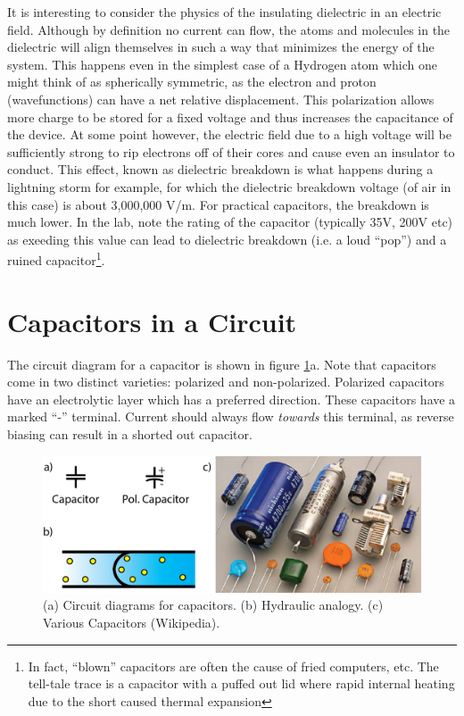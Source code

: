 \documentclass{tufte-book}
\begin{document}
It is interesting to consider the physics of the insulating dielectric in an electric field. Although by definition no current can flow, the atoms and molecules in the dielectric will align themselves in such a way that minimizes the energy of the system. This happens even in the simplest case of a Hydrogen atom which one might think of as spherically symmetric, as the electron and proton (wavefunctions) can have a net relative displacement. This polarization allows more charge to be stored for a fixed voltage and thus increases the capacitance of the device. At some point however, the electric field due to a high voltage will be sufficiently strong to rip electrons off of their cores and cause even an insulator to conduct. This effect, known as dielectric breakdown is what happens during a lightning storm for example, for which the dielectric breakdown voltage (of air in this case) is about 3,000,000 V/m. For practical capacitors, the breakdown is much lower. In the lab, note the rating of the capacitor (typically 35V, 200V etc) as exeeding this value can lead to dielectric breakdown (i.e. a loud ``pop'') and a ruined capacitor\footnote{In fact, ``blown'' capacitors are often the cause of fried computers, etc. The tell-tale trace is a capacitor with a puffed out lid where rapid internal heating due to the short caused thermal expansion}.

\section{Capacitors in a Circuit}

The circuit diagram for a capacitor is shown in figure \ref{fig:capz}a. Note that capacitors come in two distinct varieties: polarized and non-polarized. Polarized capacitors have an electrolytic layer which has a preferred direction. These capacitors have a marked ``-'' terminal. Current should always flow \textit{towards} this terminal, as reverse biasing can result in a shorted out capacitor.


\begin{figure}[h]
\caption{(a) Circuit diagrams for capacitors. (b) Hydraulic analogy. (c) Various Capacitors (Wikipedia).}
\label{fig:capz}
\begin{center}
\includegraphics[width=\textwidth]{capz}
\end{center}
\end{figure}
\end{document}
